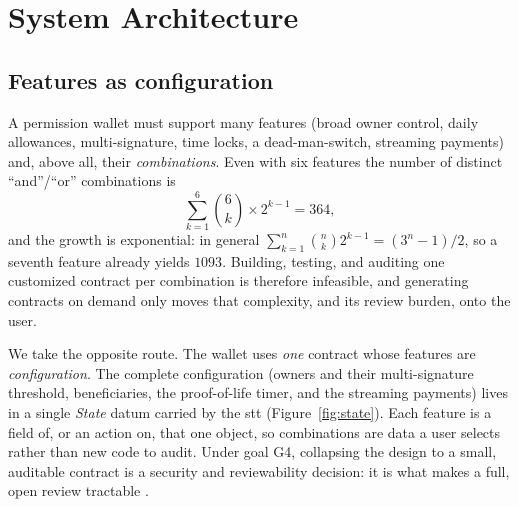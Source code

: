 \documentclass[11pt,DIV=11,parskip=half-]{scrartcl}
\begin{document}
\section{System Architecture}
\label{sec:architecture}

\subsection{Features as configuration}
A permission wallet must support many features (broad owner control, daily allowances, multi-signature, time locks, a dead-man-switch, streaming payments) and, above all, their \emph{combinations}. Even with six features the number of distinct ``and''/``or'' combinations is
\[
\sum_{k=1}^{6} \binom{6}{k} \times 2^{k-1} = 364,
\]
and the growth is exponential: in general $\sum_{k=1}^{n}\binom{n}{k}2^{k-1} = (3^{n}-1)/2$, so a seventh feature already yields $1093$. Building, testing, and auditing one customized contract per combination is therefore infeasible, and generating contracts on demand only moves that complexity, and its review burden, onto the user.

We take the opposite route. The wallet uses \emph{one} contract whose features are \emph{configuration}. The complete configuration (owners and their multi-signature threshold, beneficiaries, the proof-of-life timer, and the streaming payments) lives in a single \emph{State} datum carried by the \gls{stt} (Figure~\ref{fig:state}). Each feature is a field of, or an action on, that one object, so combinations are data a user selects rather than new code to audit. Under goal G4, collapsing the design to a small, auditable contract is a security and reviewability decision: it is what makes a full, open review tractable \cite{ncscProtocol}.
\end{document}
